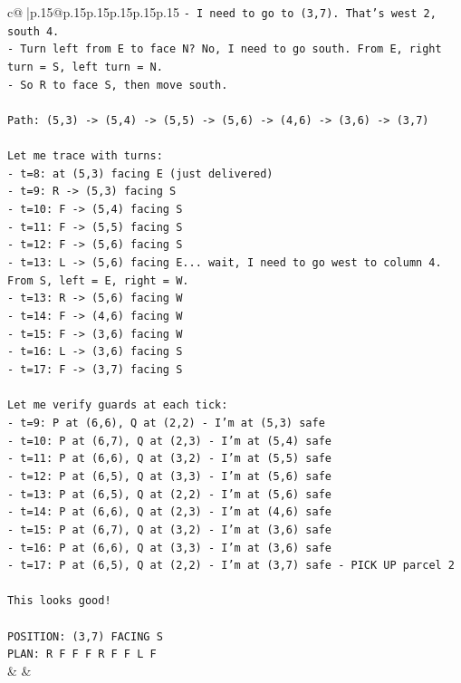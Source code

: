 \documentclass{article}
\begin{document}
{\begin{supertabular}{c@{$\;$}|p{.15\linewidth}@{}p{.15\linewidth}p{.15\linewidth}p{.15\linewidth}p{.15\linewidth}p{.15\linewidth}}
{{{\texttt{{-} I need to go to (3,7). That's west 2, south 4.} \\
\texttt{{-} Turn left from E to face N? No, I need to go south. From E, right turn = S, left turn = N.} \\
\texttt{{-} So R to face S, then move south.} \\
\\ 
\texttt{Path: (5,3) {-}> (5,4) {-}> (5,5) {-}> (5,6) {-}> (4,6) {-}> (3,6) {-}> (3,7)} \\
\\ 
\texttt{Let me trace with turns:} \\
\texttt{{-} t=8: at (5,3) facing E (just delivered)} \\
\texttt{{-} t=9: R {-}> (5,3) facing S} \\
\texttt{{-} t=10: F {-}> (5,4) facing S} \\
\texttt{{-} t=11: F {-}> (5,5) facing S} \\
\texttt{{-} t=12: F {-}> (5,6) facing S} \\
\texttt{{-} t=13: L {-}> (5,6) facing E... wait, I need to go west to column 4. From S, left = E, right = W.} \\
\texttt{{-} t=13: R {-}> (5,6) facing W} \\
\texttt{{-} t=14: F {-}> (4,6) facing W} \\
\texttt{{-} t=15: F {-}> (3,6) facing W} \\
\texttt{{-} t=16: L {-}> (3,6) facing S} \\
\texttt{{-} t=17: F {-}> (3,7) facing S} \\
\\ 
\texttt{Let me verify guards at each tick:} \\
\texttt{{-} t=9: P at (6,6), Q at (2,2) {-} I'm at (5,3) safe} \\
\texttt{{-} t=10: P at (6,7), Q at (2,3) {-} I'm at (5,4) safe} \\
\texttt{{-} t=11: P at (6,6), Q at (3,2) {-} I'm at (5,5) safe} \\
\texttt{{-} t=12: P at (6,5), Q at (3,3) {-} I'm at (5,6) safe} \\
\texttt{{-} t=13: P at (6,5), Q at (2,2) {-} I'm at (5,6) safe} \\
\texttt{{-} t=14: P at (6,6), Q at (2,3) {-} I'm at (4,6) safe} \\
\texttt{{-} t=15: P at (6,7), Q at (3,2) {-} I'm at (3,6) safe} \\
\texttt{{-} t=16: P at (6,6), Q at (3,3) {-} I'm at (3,6) safe} \\
\texttt{{-} t=17: P at (6,5), Q at (2,2) {-} I'm at (3,7) safe {-} PICK UP parcel 2} \\
\\ 
\texttt{This looks good!} \\
\\ 
\texttt{POSITION: (3,7) FACING S} \\
\texttt{PLAN: R F F F R F F L F} \\
            }
        }
    }
    & & \\ \\


\end{supertabular}}
\end{document}
